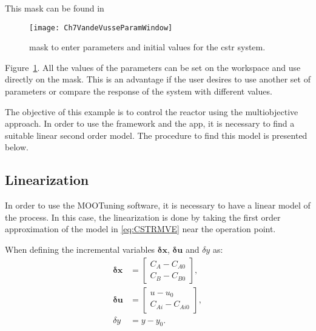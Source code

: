 This mask can be found in %
\begin{figure}[tb]
	\centering
	\texttt{[image: Ch7VandeVusseParamWindow]}
	\caption{\simulink{} mask to enter parameters and initial values for the \gls{cstr} system.}
	\label{fig:Ch7VandeVusseParamWindow}
\end{figure}  
Figure~\ref{fig:Ch7VandeVusseParamWindow}. All the values of the parameters can be set on the \matlab{} workspace and use directly on the mask. This is an advantage if the user desires to use another set of parameters or compare the response of the system with different values.

The objective of this example is to control the reactor using the multiobjective approach. In order to use the framework and the \matlab{} app, it is necessary to find a suitable linear second order model. The procedure to find this model is presented below.

\subsection{Linearization}
\label{sec:CSTRLin}
In order to use the MOOTuning software, it is necessary to have a linear model of the process. In this case, the linearization is done by taking the first order approximation of the model in \eqref{eq:CSTRMVE} near the operation point.

When defining the incremental variables $\mathbf{\delta x}$, $\mathbf{\delta u}$ and $\delta y$ as:
\begin{align*}
\mathbf{\delta x} &= \left[ \begin{array}{c} C_A - C_{A0} \\ C_B - C_{B0} \end{array} \right], \\
\mathbf{\delta u} &= \left[ \begin{array}{c} u-u_0 \\ C_{Ai} - C_{Ai0} \end{array} \right], \\
\delta y &= y - y_0 .
\end{align*}

